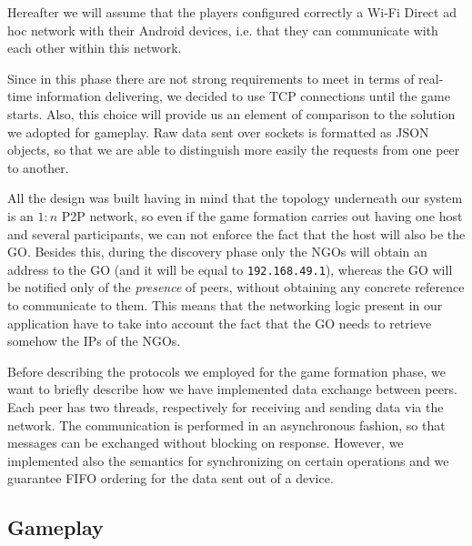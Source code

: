 Hereafter we will assume that the players configured correctly a Wi-Fi Direct
ad hoc network with their Android devices, i.e. that they can communicate with
each other within this network.

Since in this phase there are not strong requirements to meet in terms of
real-time information delivering, we decided to use TCP connections until the
game starts. Also, this choice will provide us an element of comparison to the
solution we adopted for gameplay.
Raw data sent over sockets is formatted as JSON objects, so that we are able to
distinguish more easily the requests from one peer to another.

All the design was built having in mind that the topology underneath our system
is an $1:n$ P2P network, so even if the game formation carries out having one
host and several participants, we can not enforce the fact that the host will
also be the GO. Besides this, during the discovery phase only the NGOs will
obtain an address to the GO (and it will be equal to \texttt{192.168.49.1}),
whereas the GO will be notified only of the \textit{presence} of peers, without
obtaining any concrete reference to communicate to them. This means that the
networking logic present in our application have to take into account the fact
that the GO needs to retrieve somehow the IPs of the NGOs.

Before describing the protocols we employed for the game formation phase, we
want to briefly describe how we have implemented data exchange between peers.
Each peer has two threads, respectively for receiving and sending data via the
network. The communication is performed in an asynchronous fashion, so that
messages can be exchanged without blocking on response. However, we implemented
also the semantics for synchronizing on certain operations and we guarantee FIFO
ordering for the data sent out of a device.


\subsection{Gameplay}

